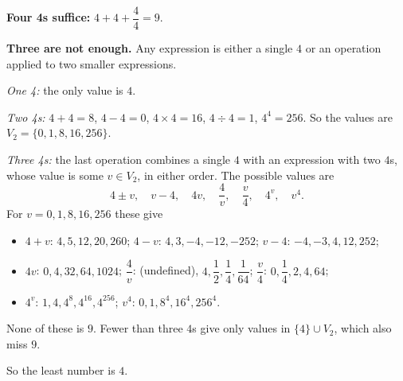 \textbf{Four 4s suffice:} $4+4+\dfrac{4}{4}=9$.

\textbf{Three are not enough.} Any expression is either a single $4$ or an operation applied to two smaller expressions.

\emph{One 4:} the only value is $4$.

\emph{Two 4s:} $4+4=8$, $4-4=0$, $4\times4=16$, $4\div4=1$, $4^4=256$. So the values are $V_2=\{0,1,8,16,256\}$.

\emph{Three 4s:} the last operation combines a single $4$ with an expression with two $4$s, whose value is some $v\in V_2$, in either order. The possible values are
\[
4\pm v,\quad v-4,\quad 4v,\quad \dfrac{4}{v},\quad \dfrac {v}{4},\quad 4^v,\quad v^4 .
\]
For $v=0,1,8,16,256$ these give
\begin{itemize}
\item $4+v$: $4,5,12,20,260$; \quad $4-v$: $4,3,-4,-12,-252$; \quad $v-4$: $-4,-3,4,12,252$;
\item $4v$: $0,4,32,64,1024$; \quad $\dfrac{4}{v}$: (undefined), $4,\dfrac{1}{2},\dfrac{1}{4},\dfrac{1}{64}$; \quad $\dfrac {v}{4}$: $0,\dfrac{1}{4},2,4,64$;
\item $4^v$: $1,4,4^8,4^{16},4^{256}$; \quad $v^4$: $0,1,8^4,16^4,256^4$.
\end{itemize}
None of these is $9$. Fewer than three $4$s give only values in $\{4\}\cup V_2$, which also miss $9$.

So the least number is $\boxed{4}$.
